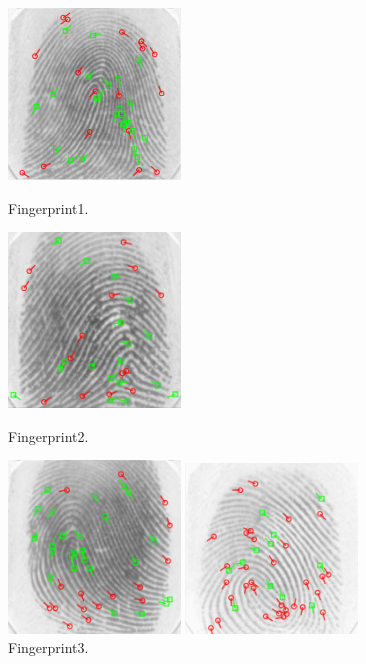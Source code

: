 \documentclass[a4paper]{article}
\begin{document}
\begin{spacing}{2.0}
\begin{figure}[h]
	\begin{minipage}[t]{0.24\linewidth}
	\centering
	\includegraphics[width = 1.8in]{1.png}
	\caption{Fingerprint1.}
	\label{scoreDis}
	\end{minipage}
	\begin{minipage}[t]{0.24\linewidth}
	\centering
	\includegraphics[width = 1.8in]{2.png}
	\caption{Fingerprint2.}
	\label{CMC}
	\end{minipage}
	\begin{minipage}[t]{0.24\linewidth}
	\centering
	\includegraphics[width = 1.8in]{3.png}
	\caption{Fingerprint3.}
	\label{ROC}
	\end{minipage}
	\begin{minipage}[t]{0.24\linewidth}
	\centering
	\includegraphics[width = 1.8in]{4.png}

\end{minipage}
\end{figure}
\end{spacing}
\end{document}
